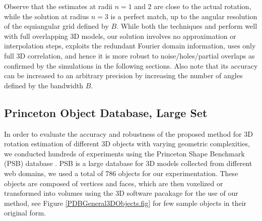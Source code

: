 \documentclass{UCF_ETD}
\begin{document}
Observe that the estimates at radii $n=1$ and $2$ are close to the actual rotation, while the solution at radius $n=3$ is a perfect match, up to the angular resolution of the equiangular grid defined by $B$. While both the techniques \cite{Salah2013} and \cite{Bulow2013} perform well with full overlapping $3$D models, our solution involves no approximation or interpolation steps, exploits the redundant Fourier domain information, uses only full $3$D correlation, and hence it is more robust to noise/holes/partial overlaps as confirmed by the simulations in the following sections. %
Also note that its accuracy can be increased to an  arbitrary precision by increasing the number of angles defined by the bandwidth $B$.
\subsection{Princeton Object Database, Large Set}
In order to evaluate the accuracy and robustness of the proposed method for $3$D rotation estimation of
different $3$D objects with varying geometric complexities, we conducted hundreds of experiments using the Princeton Shape Benchmark (PSB) database \cite{Princeton2004}. PSB is a large database for $3$D models collected from different web domains, we used a total of $786$ objects for our experimentation. These objects are composed of vertices and faces, which are then voxelized or transformed into volumes using the $3$D software pacakage \cite{SPHARM-MAT2016} for the use of our method, see Figure \ref{PDBGeneral3DObjects.fig} for few sample objects in their original form. 
\end{document}
